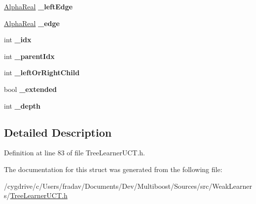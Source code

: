 \begin{DoxyCompactItemize}
\item 
\hypertarget{structMultiBoost_1_1NodePointUCT_acf88811518cd0ad2050ac336f23ce696}{
\hyperlink{Defaults_8h_a80184c4fd10ab70a1a17c5f97dcd1563}{AlphaReal} {\bfseries \_\-leftEdge}}
\label{structMultiBoost_1_1NodePointUCT_acf88811518cd0ad2050ac336f23ce696}

\item 
\hypertarget{structMultiBoost_1_1NodePointUCT_a70a6b7ebfc212125f1f846cb8542e541}{
\hyperlink{Defaults_8h_a80184c4fd10ab70a1a17c5f97dcd1563}{AlphaReal} {\bfseries \_\-edge}}
\label{structMultiBoost_1_1NodePointUCT_a70a6b7ebfc212125f1f846cb8542e541}

\item 
\hypertarget{structMultiBoost_1_1NodePointUCT_a31a4e85fed5cbfdc0f7c06f75d5afde5}{
int {\bfseries \_\-idx}}
\label{structMultiBoost_1_1NodePointUCT_a31a4e85fed5cbfdc0f7c06f75d5afde5}

\item 
\hypertarget{structMultiBoost_1_1NodePointUCT_a940b7018ece16780a04f2406c292881e}{
int {\bfseries \_\-parentIdx}}
\label{structMultiBoost_1_1NodePointUCT_a940b7018ece16780a04f2406c292881e}

\item 
\hypertarget{structMultiBoost_1_1NodePointUCT_ad900ec4bddb79addc1fe987942e34de7}{
int {\bfseries \_\-leftOrRightChild}}
\label{structMultiBoost_1_1NodePointUCT_ad900ec4bddb79addc1fe987942e34de7}

\item 
\hypertarget{structMultiBoost_1_1NodePointUCT_acc9c9bcc748e8a4c8a590056201faa03}{
bool {\bfseries \_\-extended}}
\label{structMultiBoost_1_1NodePointUCT_acc9c9bcc748e8a4c8a590056201faa03}

\item 
\hypertarget{structMultiBoost_1_1NodePointUCT_a65b8b27f7274420a6c62ca868d15d1c4}{
int {\bfseries \_\-depth}}
\label{structMultiBoost_1_1NodePointUCT_a65b8b27f7274420a6c62ca868d15d1c4}

\end{DoxyCompactItemize}


\subsection{Detailed Description}


Definition at line 83 of file TreeLearnerUCT.h.



The documentation for this struct was generated from the following file:\begin{DoxyCompactItemize}
\item 
/cygdrive/c/Users/fradav/Documents/Dev/Multiboost/Sources/src/WeakLearners/\hyperlink{TreeLearnerUCT_8h}{TreeLearnerUCT.h}\end{DoxyCompactItemize}
